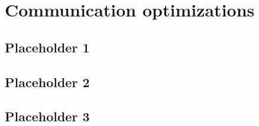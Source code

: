 
\chapter{Communication optimizations}

\section{Placeholder 1}

\section{Placeholder 2}

\section{Placeholder 3}

